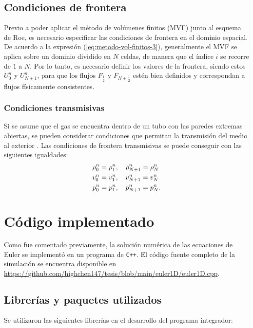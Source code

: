 \subsection{Condiciones de frontera}
Previo a poder aplicar el método de volúmenes finitos (MVF) junto al esquema de Roe, es necesario especificar las condiciones de frontera en el dominio espacial.
De acuerdo a la expresión (\ref{eq:metodo-vol-finitos-3}), generalmente el MVF se aplica sobre un dominio dividido en $N$ celdas, de manera que el índice $i$ se recorre de $1$ a $N$. Por lo tanto, es necesario definir los valores de la frontera, siendo estos $U_{0}^{n}$ y $U_{N+1}^{n}$, para que los flujos $F_{\frac{1}{2}}$ y $F_{N+\frac{1}{2}}$ estén bien definidos y correspondan a flujos físicamente consistentes.
\subsubsection{Condiciones transmisivas}
Si se asume que el gas se encuentra dentro de un tubo con las paredes extremas abiertas, se pueden considerar condiciones que permitan la transmisión del medio al exterior \cite{thesis-euler-godunov}. Las condiciones de frontera transmisivas se puede conseguir con las siguientes igualdades:
\begin{align}
	\rho_{0}^{n} = \rho_{1}^{n}, \hspace{4mm}&
	\rho_{N+1}^{n} = \rho_{N}^{n} \\
	v_{0}^{n} = v_{1}^{n}, \hspace{4mm}&
	v_{N+1}^{n} = v_{N}^{n} \\
	p_{0}^{n} = p_{1}^{n}, \hspace{4mm}&
	p_{N+1}^{n} = p_{N}^{n}.
\end{align}
\section{Código implementado}
\lstset{inputencoding=utf8/latin1}
Como fue comentado previamente, la solución numérica de las ecuaciones de Euler se implementó en un programa de \texttt{C++}. El código fuente completo de la simulación se encuentra disponible en \url{https://github.com/highchen147/tesis/blob/main/euler1D/euler1D.cpp}.

\subsection{Librerías y paquetes utilizados}
Se utilizaron las siguientes librerías en el desarrollo del programa integrador:


